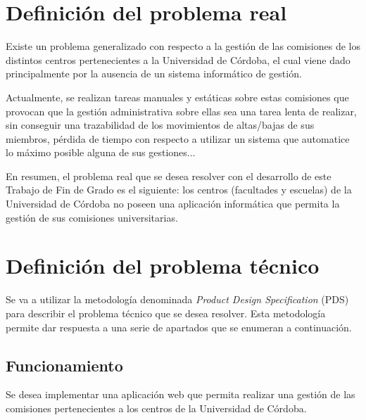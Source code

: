\section{Definición del problema real}
    
    Existe un problema generalizado con respecto a la gestión de las comisiones de los distintos centros pertenecientes a la Universidad de Córdoba, el cual viene dado principalmente por la ausencia de un sistema informático de gestión.
    
    Actualmente, se realizan tareas manuales y estáticas sobre estas comisiones que provocan que la gestión administrativa sobre ellas sea una tarea lenta de realizar, sin conseguir una trazabilidad de los movimientos de altas/bajas de sus miembros, pérdida de tiempo con respecto a utilizar un sistema que automatice lo máximo posible alguna de sus gestiones...

    En resumen, el problema real que se desea resolver con el desarrollo de este Trabajo de Fin de Grado es el siguiente: los centros (facultades y escuelas) de la Universidad de Córdoba no poseen una aplicación informática que permita la gestión de sus comisiones universitarias.
    
 
\section{Definición del problema técnico}

    Se va a utilizar la metodología denominada \textit{Product Design Specification} (PDS) para describir el problema técnico que se desea resolver. Esta metodología permite dar respuesta a una serie de apartados que se enumeran a continuación.
    
\subsection{Funcionamiento}
    Se desea implementar una aplicación web que permita realizar una gestión de las comisiones pertenecientes a los centros de la Universidad de Córdoba. 
    

